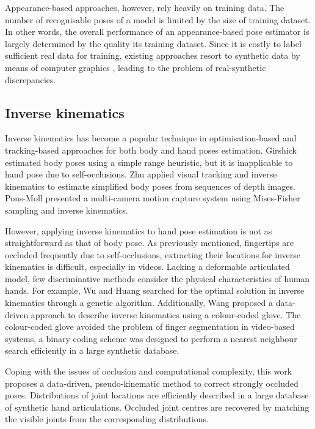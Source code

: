 Appearance-based approaches, however, rely heavily on training data. 
The number of recognisable poses of a model is limited by the size of training dataset. In other words, the overall performance of an appearance-based pose estimator is largely determined by the quality its training dataset. 
Since it is costly to label sufficient real data for training, existing approaches resort to synthetic data by means of computer graphics \cite{Romero2009, Keskin2012}, leading to the problem of real-synthetic discrepancies.

\subsection{Inverse kinematics}   
Inverse kinematics has become a popular technique in optimisation-based and tracking-based  approaches for both body and hand poses estimation. 
Girshick \etal \cite{Girshick2011} estimated body poses using a simple range heuristic, but it is inapplicable to hand pose due to self-occlusions. 
Zhu \etal \cite{Zhu2008a} applied visual tracking and inverse kinematics to estimate simplified body poses from sequences of depth images.
Pons-Moll \etal \cite{Pons-Moll2011} presented a multi-camera motion capture system using Mises-Fisher sampling and inverse kinematics.  

However, applying inverse kinematics to hand pose estimation is not as straightforward as that of body pose. As previously mentioned, fingertips are occluded frequently due to self-occlusions, extracting their locations for inverse kinematics is difficult, especially in videos. 
Lacking a deformable articulated model, few discriminative methods consider the physical characteristics of human hands. For example, Wu and Huang \cite{Wu1999} searched for the optimal solution in inverse kinematics through a genetic algorithm. Additionally, Wang \etal \cite{Wang2009} proposed a data-driven approach to describe inverse kinematics using a colour-coded glove. The colour-coded glove avoided the problem of finger segmentation in video-based systems, a binary coding scheme was designed to perform a nearest neighbour search efficiently in a large synthetic database. 

Coping with the issues of occlusion and computational complexity, this work proposes a data-driven, pseudo-kinematic method to correct strongly occluded poses. Distributions of joint locations are efficiently described in a large database of synthetic hand articulations. Occluded joint centres are recovered by matching the visible joints from the corresponding distributions.

